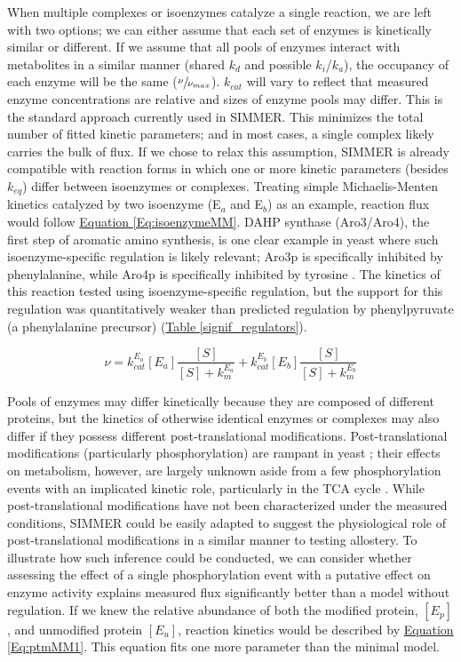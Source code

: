 When multiple complexes or isoenzymes catalyze a single reaction, we are left with two options; we can either assume that each set of enzymes is kinetically similar or different. If we assume that all pools of enzymes interact with metabolites in a similar manner (shared $k_{d}$ and possible $k_{i}$/$k_{a}$), the occupancy of each enzyme will be the same ($\sfrac{\nu}{\nu_{max}}$). $k_{cat}$ will vary to reflect that measured enzyme concentrations are relative and sizes of enzyme pools may differ. This is the standard approach currently used in SIMMER. This minimizes the total number of fitted kinetic parameters; and in most cases, a single complex likely carries the bulk of flux. If we chose to relax this assumption, SIMMER is already  compatible with reaction forms in which one or more kinetic parameters (besides $k_{eq}$) differ between isoenzymes or complexes. Treating simple Michaelis-Menten kinetics catalyzed by two isoenzyme (E$_{a}$ and E$_{b}$) as an example, reaction flux would follow \hyperref[Eq:isoenzymeMM]{Equation \ref{Eq:isoenzymeMM}}. DAHP synthase (Aro3/Aro4), the first step of aromatic amino synthesis, is one clear example in yeast where such isoenzyme-specific regulation is likely relevant; Aro3p is specifically inhibited by phenylalanine, while Aro4p is specifically inhibited by tyrosine \cite{Schnappauf:1998ec}. The kinetics of this reaction tested using isoenzyme-specific regulation, but the support for this regulation was quantitatively weaker than predicted regulation by phenylpyruvate (a phenylalanine precursor) (\hyperref[signif_regulators]{Table \ref{signif_regulators}}). 

\begin{equation}
\nu = k_{cat}^{E_{a}}\left[E_{a}\right]\frac{\left[S\right]}{\left[S\right] + k_{m}^{E_{a}}} + k_{cat}^{E_{b}}\left[E_{b}\right]\frac{\left[S\right]}{\left[S\right] + k_{m}^{E_{b}}}\label{Eq:isoenzymeMM}
\end{equation}

Pools of enzymes may differ kinetically because they are composed of different proteins, but the kinetics of otherwise identical enzymes or complexes may also differ if they possess different post-translational modifications.  Post-translational modifications (particularly phosphorylation) are rampant in yeast \cite{Fiedler:2009hx}; their effects on metabolism, however, are largely unknown aside from a few phosphorylation events with an implicated kinetic role, particularly in the TCA cycle \cite{Schulz:2014eo}. While post-translational modifications have not been characterized under the measured conditions, SIMMER could be easily adapted to suggest the physiological role of post-translational modifications in a similar manner to testing allostery. To illustrate how such inference could be conducted, we can consider whether assessing the effect of a single phosphorylation event with a putative effect on enzyme activity explains measured flux significantly better than a model without regulation. If we knew the relative abundance of both the modified protein, $\left[E_{p}\right]$, and unmodified protein $\left[E_{u}\right]$, reaction kinetics would be described by \hyperref[Eq:ptmMM1]{Equation \ref{Eq:ptmMM1}}. This equation fits one more parameter than the minimal model.


